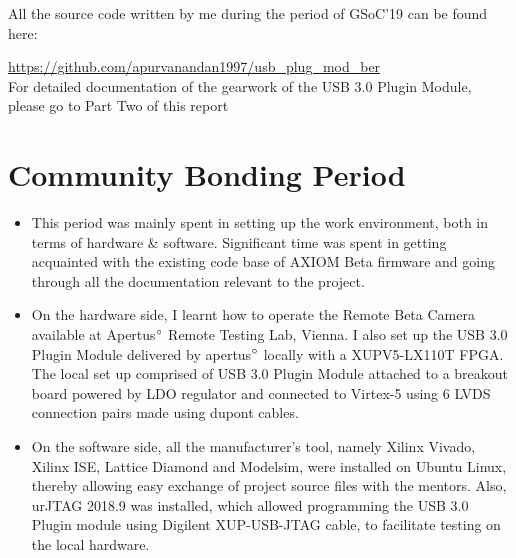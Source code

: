 \documentclass[11pt,oneside,fleqn]{book} %
\begin{document}
All the source code written by me during the period of GSoC'19 can be found here: 


\textcolor{blue}{\url{https://github.com/apurvanandan1997/usb_plug_mod_ber} }
\\
For detailed documentation of the gearwork of the USB 3.0 Plugin Module, please go to Part Two of this report 

\section{Community Bonding Period}
\begin{itemize}
  \item This period was mainly spent in setting up the work environment, both in terms of hardware \& software. Significant time was spent in getting acquainted with the existing code base of AXIOM Beta firmware and going through all the documentation relevant to the project.
  \item On the hardware side, I learnt how to operate the Remote Beta Camera available at Apertus$\degree$ Remote Testing Lab, Vienna. I also set up the USB 3.0 Plugin Module delivered by apertus$\degree$ locally with a XUPV5-LX110T FPGA. The local set up comprised of USB 3.0 Plugin Module attached to a breakout board powered by LDO regulator and connected to Virtex-5 using 6 LVDS connection pairs made using dupont cables.
  \item On the software side, all the manufacturer's tool, namely Xilinx Vivado, Xilinx ISE, Lattice Diamond and Modelsim, were installed on Ubuntu Linux, thereby allowing easy exchange of project source files with the mentors. Also, urJTAG 2018.9 was installed, which allowed programming the USB 3.0 Plugin module using Digilent XUP-USB-JTAG cable, to facilitate testing on the local hardware.

\end{itemize}



\end{document}
